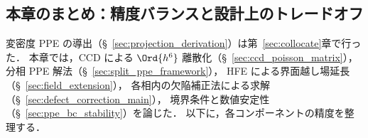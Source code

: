 %
\subsection{本章のまとめ：精度バランスと設計上のトレードオフ}
\label{sec:pressure_accuracy_summary}

変密度 PPE の導出（§~\ref{sec:projection_derivation}）は第~\ref{sec:collocate}章で行った．
本章では，CCD による $\Ord{h^6}$ 離散化（§~\ref{sec:ccd_poisson_matrix}），
分相 PPE 解法（§~\ref{sec:split_ppe_framework}），
HFE による界面越し場延長（§~\ref{sec:field_extension}），
各相内の欠陥補正法による求解（§~\ref{sec:defect_correction_main}），
境界条件と数値安定性（§~\ref{sec:ppe_bc_stability}）を論じた．
以下に，各コンポーネントの精度を整理する．

